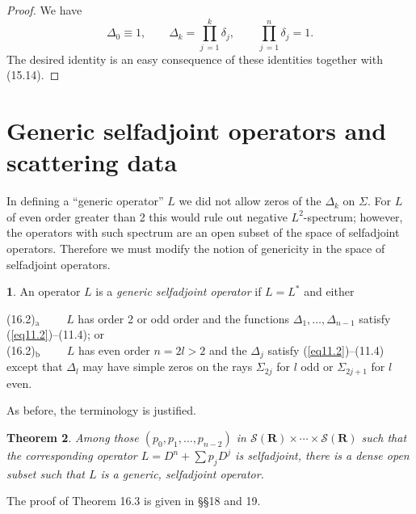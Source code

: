 \documentclass{surv-l}
\theoremstyle{plain}
\newtheorem{theorem}{Theorem}[section]
\theoremstyle{definition}
\newtheorem{definition}[theorem]{\sc{Definition}}
\numberwithin{equation}{chapter}
\begin{document}
\begin{proof}
We have
\begin{equation*}
\Delta_{0}\equiv 1,\qquad \Delta_{k}=\prod_{j\,=1}^{k}\delta_{j},\qquad \prod_{j\,=1}^{n}\delta_{j}=1.
\end{equation*}
The desired identity is an easy consequence of these identities together with (15.14).
\end{proof}

\section{Generic selfadjoint operators and scattering data}\label{sec16}

In defining a ``generic operator'' $L$ we did not allow zeros of the $\Delta_{k}$ on $\Sigma$. For $L$ of even order greater than 2 this would rule out negative $L^{2}$-spectrum; however, the operators with such spectrum are an open subset of the space of selfadjoint operators. Therefore we must modify the notion of genericity in the space of selfadjoint operators.

\setcounter{theorem}{0}
\begin{definition}\label{def16.1}
An operator $L$ is a  \emph{generic selfadjoint operator} if  $L=L^{*}$ and either
\end{definition}
(16.2)$_{\mathrm{a}}\qquad$ $L$ has order 2 or odd order and the functions $\Delta_{1},\ldots,\Delta_{n-1}$
satisfy (\ref{eq11.2})--(11.4); or\\

(16.2)$_{\mathrm{b}}\qquad$ $L$ has even order $n=2l>2$ and the $\Delta_{j}$ satisfy (\ref{eq11.2})--(11.4)
except that $\Delta_{l}$ may have simple zeros on the rays $\Sigma_{2j}$ for $l$ odd
or $\Sigma_{2j+1}$ for $l$ even.

As before, the terminology is justified.
\setcounter{theorem}{2}
\begin{theorem}\label{them16.3}
Among those $(p_{0},p_{1},\ldots, p_{n-2})$  in $\mathscr{S}(\mathbf{R})\times \cdots \times \mathscr{S}(\mathbf{R})$ such that the corresponding operator $L=D^{n}+\sum p_{j}D^{j}$ is selfadjoint, there is a dense open subset such that $L$ is a generic, selfadjoint operator.
\end{theorem}
The proof of Theorem 16.3 is given in \S\S 18 and 19.
\end{document}
